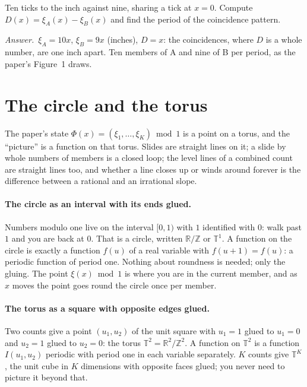 \documentclass[10pt]{article}
\theoremstyle{plain}
\theoremstyle{definition}
\newcommand{\answer}{\par\smallskip\noindent\textit{Answer.}\ }
\newcommand{\R}{\mathbb{R}}
\newcommand{\Z}{\mathbb{Z}}
\newcommand{\tor}{\mathbb{T}}
\newcommand{\cnt}{\xi}
\begin{document}
\begin{checkyourself}
Ten ticks to the inch against nine, sharing a tick at $x=0$. Compute
$D(x)=\cnt_A(x)-\cnt_B(x)$ and find the period of the coincidence pattern.
\answer $\cnt_A=10x$, $\cnt_B=9x$ (inches), $D=x$: the coincidences, where
$D$ is a whole number, are one inch apart. Ten members of A and nine of B
per period, as the paper's Figure~1 draws.
\end{checkyourself}

\section{The circle and the torus}
\label{p:torus}

\begin{why}
The paper's state $\Phi(x)=(\cnt_1,\dots,\cnt_K)\bmod1$ is a point on a
torus, and the ``picture'' is a function on that torus. Slides are straight
lines on it; a slide by whole numbers of members is a closed loop; the
level lines of a combined count are straight lines too, and whether a line
closes up or winds around forever is the difference between a rational and
an irrational slope.
\end{why}

\paragraph{The circle as an interval with its ends glued.}
Numbers modulo one live on the interval $[0,1)$ with $1$ identified with
$0$: walk past $1$ and you are back at $0$. That is a circle, written
$\R/\Z$ or $\tor^1$. A function on the circle is exactly a function $f(u)$
of a real variable with $f(u+1)=f(u)$: a periodic function of period one.
Nothing about roundness is needed; only the gluing. The point $\cnt(x)\bmod1$
is where you are in the current member, and as $x$ moves the point goes
round the circle once per member.

\paragraph{The torus as a square with opposite edges glued.}
Two counts give a point $(u_1,u_2)$ of the unit square with $u_1=1$ glued to
$u_1=0$ and $u_2=1$ glued to $u_2=0$: the torus $\tor^2=\R^2/\Z^2$. A
function on $\tor^2$ is a function $I(u_1,u_2)$ periodic with period one in
each variable separately. $K$ counts give $\tor^K$, the unit cube in $K$
dimensions with opposite faces glued; you never need to picture it beyond
that.
\end{document}

